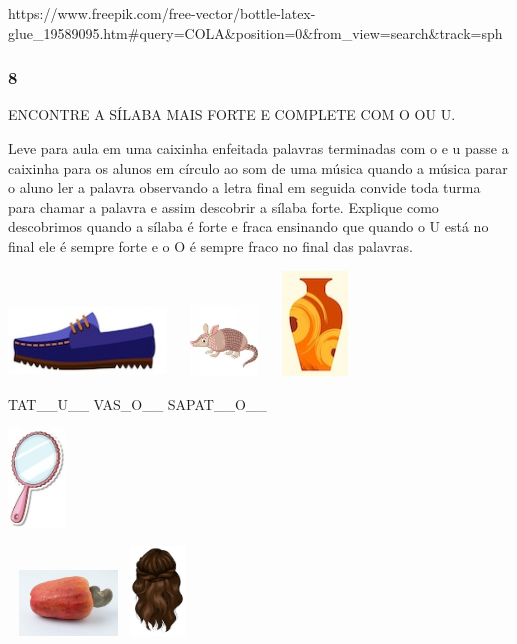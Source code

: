 https://www.freepik.com/free-vector/bottle-latex-glue\_19589095.htm\#query=COLA\&position=0\&from\_view=search\&track=sph

\subsubsection{8 }\label{section-7}

ENCONTRE A SÍLABA MAIS FORTE E COMPLETE COM O OU U.

Leve para aula em uma caixinha enfeitada palavras terminadas com o e u
passe a caixinha para os alunos em círculo ao som de uma música quando a
música parar o aluno ler a palavra observando a letra final em seguida
convide toda turma para chamar a palavra e assim descobrir a sílaba
forte. Explique como descobrimos quando a sílaba é forte e fraca
ensinando que quando o U está no final ele é sempre forte e o O é sempre
fraco no final das palavras.

\includegraphics[width=1.65486in,height=0.74499in]{media/image34.jpeg}
\includegraphics[width=1.09512in,height=0.74522in]{media/image35.jpeg}
\includegraphics[width=0.69978in,height=1.10152in]{media/image36.jpeg}

TAT\_\_U\_\_ VAS\_O\_\_ SAPAT\_\_O\_\_

\includegraphics[width=0.59861in,height=1.03542in]{media/image37.jpeg}

\includegraphics[width=1.26250in,height=0.68750in]{media/image38.jpeg}\includegraphics[width=0.59873in,height=0.93296in]{media/image39.jpeg}

